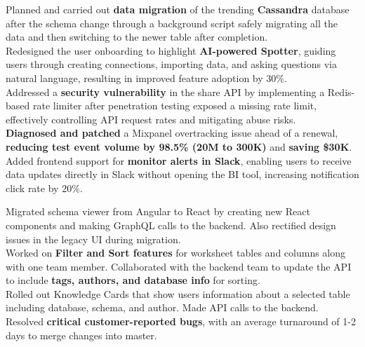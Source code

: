 \documentclass[]{Nikhil_Kadiyan_Resume}
\begin{document}
\pt Planned and carried out \textbf{data migration} of the trending \textbf{Cassandra} database after the schema change through a background script safely migrating all the data and then switching to the newer table after completion.\\
\pt Redesigned the user onboarding to highlight \textbf{AI-powered Spotter}, guiding users through creating connections, importing data, and asking questions via natural language, resulting in improved feature adoption by 30\%.\\
\pt Addressed a \textbf{security vulnerability} in the share API by implementing a Redis-based rate limiter after penetration testing exposed a missing rate limit, effectively controlling API request rates and mitigating abuse risks.\\
\pt \textbf{Diagnosed and patched} a Mixpanel overtracking issue ahead of a renewal, \textbf{reducing test event volume by 98.5\% (20M to 300K)} and \textbf{saving \$30K}.\\ %
\pt Added frontend support for \textbf{monitor alerts in Slack}, enabling users to receive data updates directly in Slack without opening the BI tool, increasing notification click rate by 20\%.\\
\sectionsep

\pt Migrated schema viewer from Angular to React by creating new React components and making GraphQL calls to the backend. Also rectified design issues in the legacy UI during migration.\\
\pt Worked on \textbf{Filter and Sort features} for worksheet tables and columns along with one team member. Collaborated with the backend team to update the API to include \textbf{tags, authors, and database info} for sorting.\\
\pt Rolled out Knowledge Cards that show users information about a selected table including database, schema, and author. Made API calls to the backend.\\
\pt Resolved \textbf{critical customer-reported bugs}, with an average turnaround of 1-2 days to merge changes into master.\\
\sectionsep
\end{document}
